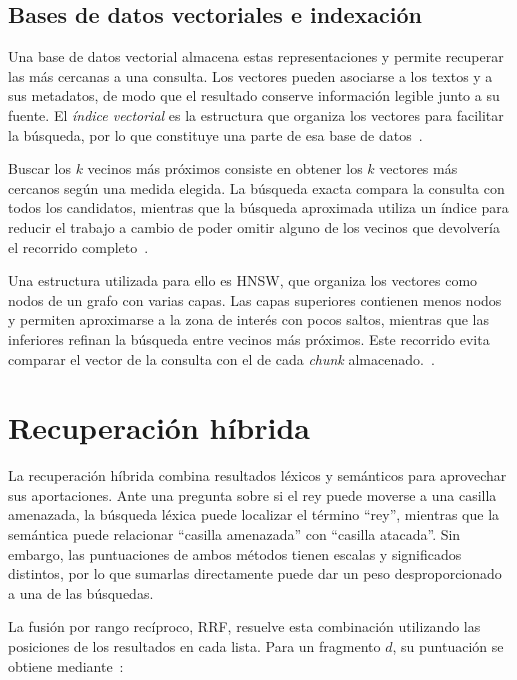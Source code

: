 \subsection{Bases de datos vectoriales e indexación}

Una base de datos vectorial almacena estas representaciones y
permite recuperar las más cercanas a una consulta. Los vectores
pueden asociarse a los textos y a sus metadatos, de modo que el
resultado conserve información legible junto a su fuente. El
\textit{índice vectorial} es la estructura que organiza los
vectores para facilitar la búsqueda, por lo que constituye una
parte de esa base de datos~\cite{chroma_colecciones}.

Buscar los $k$ vecinos más próximos consiste en obtener los $k$
vectores más cercanos según una medida elegida. La búsqueda exacta
compara la consulta con todos los candidatos, mientras que la
búsqueda aproximada utiliza un índice para reducir el trabajo a
cambio de poder omitir alguno de los vecinos que devolvería el
recorrido completo~\cite{malkov2018hnsw}.

Una estructura utilizada para ello es \ac{HNSW}, que organiza los
vectores como nodos de un grafo con varias capas. Las capas
superiores contienen menos nodos y permiten aproximarse a la zona
de interés con pocos saltos, mientras que las inferiores refinan la
búsqueda entre vecinos más próximos. Este recorrido evita comparar
el vector de la consulta con el de cada \textit{chunk} almacenado.~\cite{malkov2018hnsw}.

\section{Recuperación híbrida}

La recuperación híbrida combina resultados léxicos y semánticos para aprovechar sus aportaciones. Ante una pregunta sobre si el rey puede moverse a una casilla amenazada, la búsqueda léxica puede localizar el término \enquote{rey}, mientras que la semántica puede relacionar \enquote{casilla amenazada} con \enquote{casilla atacada}. Sin embargo, las puntuaciones de ambos métodos tienen escalas y significados distintos, por lo que sumarlas directamente puede dar un peso desproporcionado a una de las búsquedas.

La fusión por rango recíproco, \acs{RRF}, resuelve esta combinación utilizando las posiciones de los resultados en cada lista. Para un fragmento $d$, su puntuación se obtiene mediante~\cite{cormack2009rrf}:


